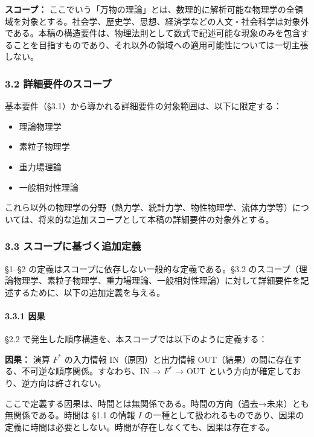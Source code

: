 \documentclass[a4paper,11pt]{ltjsarticle}
\providecommand{\tightlist}{\setlength{\itemsep}{0pt}\setlength{\parskip}{0pt}}
\begin{document}
\textbf{スコープ：}
ここでいう「万物の理論」とは、数理的に解析可能な物理学の全領域を対象とする。社会学、歴史学、思想、経済学などの人文・社会科学は対象外である。本稿の構造要件は、物理法則として数式で記述可能な現象のみを包含することを目指すものであり、それ以外の領域への適用可能性については一切主張しない。

\subsubsection{3.2
詳細要件のスコープ}\label{ux8a73ux7d30ux8981ux4ef6ux306eux30b9ux30b3ux30fcux30d7}

基本要件（§3.1）から導かれる詳細要件の対象範囲は、以下に限定する：

\begin{itemize}
\tightlist
\item
  理論物理学
\item
  素粒子物理学
\item
  重力場理論
\item
  一般相対性理論
\end{itemize}

これら以外の物理学の分野（熱力学、統計力学、物性物理学、流体力学等）については、将来的な追加スコープとして本稿の詳細要件の対象外とする。

\subsubsection{3.3
スコープに基づく追加定義}\label{ux30b9ux30b3ux30fcux30d7ux306bux57faux3065ux304fux8ffdux52a0ux5b9aux7fa9}

§1--§2 の定義はスコープに依存しない一般的な定義である。§3.2
のスコープ（理論物理学、素粒子物理学、重力場理論、一般相対性理論）に対して詳細要件を記述するために、以下の追加定義を与える。

\paragraph{3.3.1 因果}\label{ux56e0ux679c}

§2.2 で発生した順序構造を、本スコープでは以下のように定義する：

\textbf{因果：} 演算 \(F^*\) の入力情報
\(\mathrm{IN}\)（原因）と出力情報
\(\mathrm{OUT}\)（結果）の間に存在する、不可逆な順序関係。すなわち、\(\mathrm{IN}\)
→ \(F^*\) → \(\mathrm{OUT}\)
という方向が確定しており、逆方向は許されない。

ここで定義する因果は、時間とは無関係である。時間の方向（過去→未来）とも無関係である。時間は
§1.1 の情報 \(I\)
の一種として扱われるものであり、因果の定義に時間は必要としない。時間が存在しなくても、因果は存在する。
\end{document}
